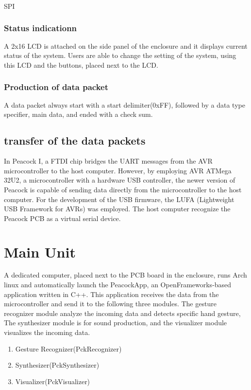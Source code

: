 \documentclass{nime-alternate}
\begin{document}
SPI 

\subsubsection{Status indicationn} %

A 2x16 LCD is attached on the side panel of the enclosure and it displays current status of the system. Users are able to change the setting of the system, using this LCD and the buttons, placed next to the LCD.

\subsubsection{Production of data packet} %

A data packet always start with a start delimiter(0xFF), followed by a data type specifier, main data, and ended with a check sum. 

\subsection{transfer of the data packets} %

In Peacock I, a FTDI chip bridges the UART messages from the AVR microcontroller to the host computer.
However, by employing AVR ATMega 32U2, a microcontroller with a hardware USB controller, the newer version of Peacock is capable of sending data directly from the microcontroller to the host computer. For the development of the USB firmware, the LUFA (Lightweight USB Framework for AVRs)\cite{camera:lufa} was employed. The host computer recognize the Peacock PCB as a virtual serial device.

\section{Main Unit} %
A dedicated computer, placed next to the PCB board in the enclosure, runs Arch linux and automatically launch the PeacockApp, an OpenFrameworks\cite{openframeworks}-based application written in C++. This application receives the data from the microcontroller and send it to the following three modules. The gesture recognizer module analyze the incoming data and detects specific hand gesture, The synthesizer module is for sound production, and the visualizer module visualizes the incoming data.

\begin{enumerate}
       \item Gesture Recognizer(PckRecognizer)
       \item Synthesizer(PckSynthesizer)
       \item Visualizer(PckVisualizer)
\end{enumerate}
\end{document}
